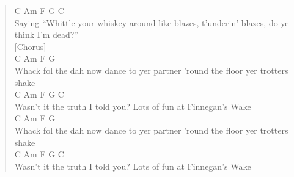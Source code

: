 \documentclass[11pt]{article}
\begin{document}
\begin{verse}
\hspace*{7em}C                      Am                 F                        G         C\\
Saying ``Whittle your whiskey around like blazes, t'underin' blazes, do ye think I'm dead?''\\
\vspace*{1em}
[Chorus]\\
C                     Am                    F                   G\\
Whack fol the dah now dance to yer partner 'round the floor yer trotters shake\\
C             Am                F              G          C\\
Wasn't it the truth I told you? Lots of fun at Finnegan's Wake\\
\vspace*{1em}
C                     Am                    F                   G\\
Whack fol the dah now dance to yer partner 'round the floor yer trotters shake\\
C             Am                F              G          C\\
Wasn't it the truth I told you? Lots of fun at Finnegan's Wake\\
\end{verse}
\clearpage
\end{document}
